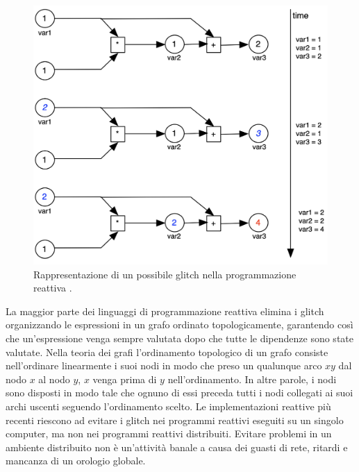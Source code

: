 \documentclass[12pt,a4paper,openright,twoside]{book}
\begin{document}
\begin{figure}
    \centering
    \includegraphics[width=.65\linewidth]{figures/reactive-programming/RP-glitch.png}
    \caption{Rappresentazione di un possibile glitch nella programmazione reattiva \cite{DBLP:journals/csur/BainomugishaCCMM13}.}
    \label{fig:rp-glitch}
\end{figure}

La maggior parte dei linguaggi di programmazione reattiva elimina i glitch organizzando le espressioni in un grafo ordinato topologicamente, garantendo così che un'espressione venga sempre valutata dopo che tutte le dipendenze sono state valutate. 
Nella teoria dei grafi l'ordinamento topologico di un grafo consiste nell'ordinare linearmente i suoi nodi in modo che preso un qualunque arco $xy$ dal nodo $x$ al nodo $y$, $x$ venga prima di $y$ nell'ordinamento. In altre parole, i nodi sono disposti in modo tale che ognuno di essi preceda tutti i nodi collegati ai suoi archi uscenti seguendo l'ordinamento scelto.
Le implementazioni reattive più recenti riescono ad evitare i glitch nei programmi reattivi eseguiti su un singolo computer, ma non nei programmi reattivi distribuiti. Evitare problemi in un ambiente distribuito non è un'attività banale a causa dei guasti di rete, ritardi e mancanza di un orologio globale.
\end{document}
